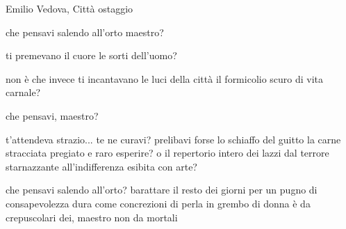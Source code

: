 \clearpage


\begin{artItem}
	Emilio Vedova, Città ostaggio
\end{artItem}

\begin{poem}
	\begin{stanza}
		che pensavi salendo all'orto\verseline
		maestro?
	\end{stanza}

	\begin{stanza}
		ti premevano il cuore le sorti dell'uomo?
	\end{stanza}

	\begin{stanza}
		non è che invece\verseline
		ti incantavano le luci della città\verseline
		il formicolio scuro di vita carnale?
	\end{stanza}

	\begin{stanza}
		che pensavi, maestro?
	\end{stanza}

	\begin{stanza}
		t'attendeva strazio... te ne curavi?\verseline
		prelibavi forse lo schiaffo del guitto\verseline
		la carne stracciata\verseline
		pregiato e raro esperire?\verseline
		o il repertorio intero dei lazzi\verseline
		dal terrore starnazzante\verseline
		all'indifferenza esibita con arte?
	\end{stanza}

	\begin{stanza}
		che pensavi salendo all'orto?\verseline
		barattare il resto dei giorni\verseline
		per un pugno di consapevolezza\verseline
		dura come concrezioni di perla in grembo di donna\verseline
		è da crepuscolari dei, maestro\verseline
		non da mortali
	\end{stanza}
\end{poem}

\clearpage



